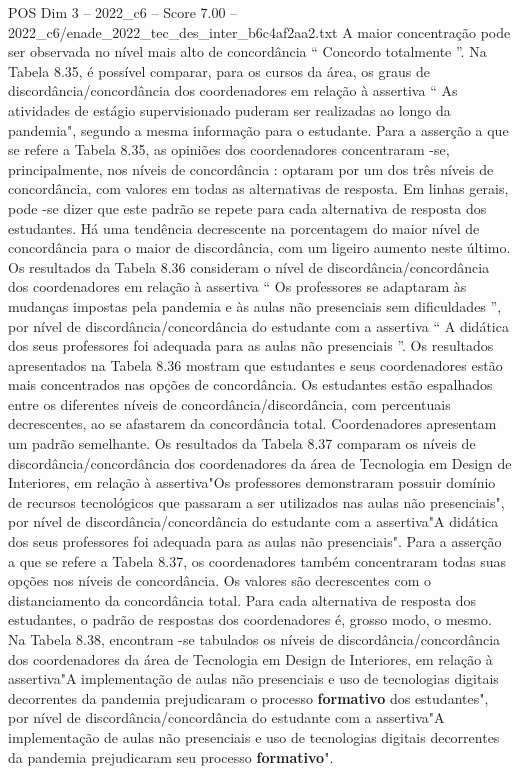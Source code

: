 \begin{textsample}{POS Dim 3 – 2022\_c6 – Score 7.00 – 2022\_c6/enade\_2022\_tec\_des\_inter\_b6c4af2aa2.txt}
A maior concentração pode ser observada no nível mais alto de concordância “ Concordo totalmente ”.
Na Tabela 8.35, é possível comparar, para os cursos da área, os graus de discordância/concordância dos coordenadores em relação à assertiva “ As atividades de estágio supervisionado puderam ser realizadas ao longo da pandemia", segundo a mesma informação para o estudante.
Para a asserção a que se refere a Tabela 8.35, as opiniões dos coordenadores concentraram -se, principalmente, nos níveis de concordância : optaram por um dos três níveis de concordância, com valores em todas as alternativas de resposta.
Em linhas gerais, pode -se dizer que este padrão se repete para cada alternativa de resposta dos estudantes.
Há uma tendência decrescente na porcentagem do maior nível de concordância para o maior de discordância, com um ligeiro aumento neste último.
Os resultados da Tabela 8.36 consideram o nível de discordância/concordância dos coordenadores em relação à assertiva “ Os professores se adaptaram às mudanças impostas pela pandemia e às aulas não presenciais sem dificuldades ”, por nível de discordância/concordância do estudante com a assertiva “ A didática dos seus professores foi adequada para as aulas não presenciais ”.
Os resultados apresentados na Tabela 8.36 mostram que estudantes e seus coordenadores estão mais concentrados nas opções de concordância.
Os estudantes estão espalhados entre os diferentes níveis de concordância/discordância, com percentuais decrescentes, ao se afastarem da concordância total.
Coordenadores apresentam um padrão semelhante.
Os resultados da Tabela 8.37 comparam os níveis de discordância/concordância dos coordenadores da área de Tecnologia em Design de Interiores, em relação à assertiva"Os professores demonstraram possuir domínio de recursos tecnológicos que passaram a ser utilizados nas aulas não presenciais", por nível de discordância/concordância do estudante com a assertiva"A didática dos seus professores foi adequada para as aulas não presenciais".
Para a asserção a que se refere a Tabela 8.37, os coordenadores também concentraram todas suas opções nos níveis de concordância.
Os valores são decrescentes com o distanciamento da concordância total.
Para cada alternativa de resposta dos estudantes, o padrão de respostas dos coordenadores é, grosso modo, o mesmo.
Na Tabela 8.38, encontram -se tabulados os níveis de discordância/concordância dos coordenadores da área de Tecnologia em Design de Interiores, em relação à assertiva"A implementação de aulas não presenciais e uso de tecnologias digitais decorrentes da pandemia prejudicaram o processo \textbf{formativo} dos estudantes", por nível de discordância/concordância do estudante com a assertiva"A implementação de aulas não presenciais e uso de tecnologias digitais decorrentes da pandemia prejudicaram seu processo \textbf{formativo}".

\end{textsample}
